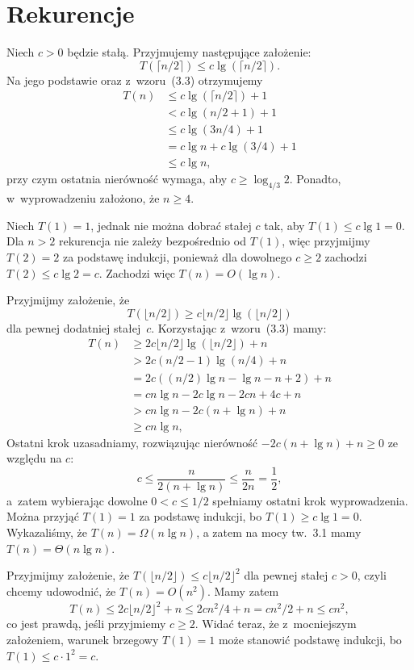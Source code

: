 \chapter{Rekurencje}


\exercise %
Niech $c>0$ będzie stałą. Przyjmujemy następujące założenie:
\[
	T(\lceil n/2\rceil) \le c\lg(\lceil n/2\rceil).
\]
Na jego podstawie oraz z~wzoru~(3.3) otrzymujemy
\begin{align*}
	T(n) &\le c\lg(\lceil n/2\rceil)+1 \\
	&< c\lg(n/2+1)+1 \\
	&\le c\lg(3n/4)+1 \\
	&= c\lg n+c\lg(3/4)+1 \\
	&\le c\lg n,
\end{align*}
przy czym ostatnia nierówność wymaga, aby $c\ge\log_{4/3}2$. Ponadto, w~wyprowadzeniu założono, że $n\ge4$.

Niech $T(1)=1$, jednak nie można dobrać stałej $c$ tak, aby $T(1)\le c\lg1=0$. Dla $n>2$ rekurencja nie zależy bezpośrednio od $T(1)$, więc przyjmijmy $T(2)=2$ za podstawę indukcji, ponieważ dla dowolnego $c\ge2$ zachodzi $T(2)\le c\lg 2=c$. Zachodzi więc $T(n)=O(\lg n)$.

\exercise %
Przyjmijmy założenie, że
\[
	T(\lfloor n/2\rfloor) \ge c\lfloor n/2\rfloor\lg(\lfloor n/2\rfloor)
\]
dla pewnej dodatniej stałej~$c$. Korzystając z~wzoru~(3.3) mamy:
\begin{align*}
	T(n) &\ge 2c\lfloor n/2\rfloor\lg(\lfloor n/2\rfloor)+n \\
	&> 2c(n/2-1)\lg(n/4)+n \\
	&= 2c((n/2)\lg n-\lg n-n+2)+n \\
	&= cn\lg n-2c\lg n-2cn+4c+n \\
	&> cn\lg n-2c(n+\lg n)+n \\
	&\ge cn\lg n,
\end{align*}
Ostatni krok uzasadniamy, rozwiązując nierówność $-2c(n+\lg n)+n\ge0$ ze względu na $c$:
\[
	c \le \frac{n}{2(n+\lg n)} \le \frac{n}{2n} = \frac{1}{2},
\]
a~zatem wybierając dowolne $0<c\le1/2$ spełniamy ostatni krok wyprowadzenia. Można przyjąć $T(1)=1$ za podstawę indukcji, bo $T(1)\ge c\lg1=0$. Wykazaliśmy, że $T(n)=\Omega(n\lg n)$, a zatem na mocy tw.~3.1 mamy $T(n)=\Theta(n\lg n)$.

\exercise %
Przyjmijmy założenie, że $T(\lfloor n/2\rfloor)\le c\lfloor n/2\rfloor^2$ dla pewnej stałej $c>0$, czyli chcemy udowodnić, że $T(n)=O(n^2)$. Mamy zatem
\[
	T(n) \le 2c\lfloor n/2\rfloor^2+n \le 2cn^2\!/4 + n = cn^2\!/2+n \le cn^2,
\]
co jest prawdą, jeśli przyjmiemy $c\ge2$. Widać teraz, że z~mocniejszym założeniem, warunek brzegowy $T(1)=1$ może stanowić podstawę indukcji, bo $T(1)\le c\cdot1^2=c$.

